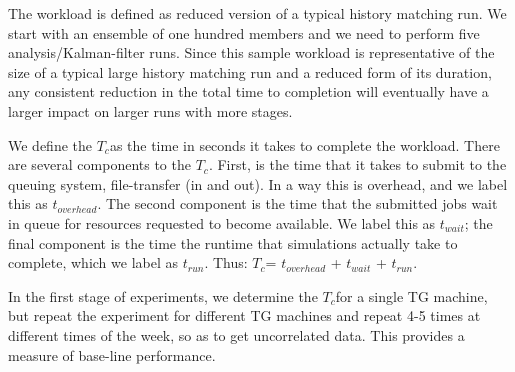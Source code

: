 \documentclass[conference,final]{IEEEtran}
\newcommand{\tc}{$T_c$}
\begin{document}

The workload is defined as reduced version of a typical history
matching run. We start with an ensemble of one hundred members and we
need to perform five analysis/Kalman-filter runs. Since this sample
workload is representative of the size of a typical large history
matching run and a reduced form of its duration, any consistent
reduction in the total time to completion will eventually have a
larger impact on larger runs with more stages.

We define the \tc as the time in seconds it takes to complete the
workload. There are several components to the \tc. First, is the time
that it takes to submit to the queuing system, file-transfer (in and
out). In a way this is overhead, and we label this as $t_{overhead}$.
The second component is the time that the submitted jobs wait in queue
for resources requested to become available. We label this as
$t_{wait}$; the final component is the time the runtime that
simulations actually take to complete, which we label as
$t_{run}$. Thus: \tc = $t_{overhead}$ + $t_{wait}$ + $t_{run}$.

In the first stage of experiments, we determine the \tc for a single
TG machine, but repeat the experiment for different TG machines and
repeat 4-5 times at different times of the week, so as to get
uncorrelated data.  This provides a measure of base-line performance.
\end{document}
